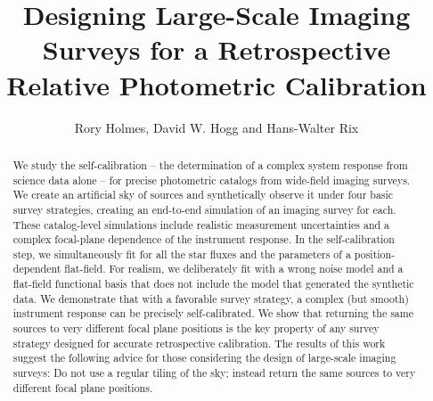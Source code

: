 \documentclass[preprint,pdftex]{aastex}
\begin{document}

\title{Designing Large-Scale Imaging Surveys for a Retrospective Relative Photometric Calibration}


\author{Rory Holmes, David W. Hogg and Hans-Walter Rix}

\begin{abstract}
We study the self-calibration -- the determination of a complex system
response from science data alone -- for precise photometric catalogs
from wide-field imaging surveys. We create an artificial sky of sources
and synthetically observe it under four basic survey strategies,
creating an end-to-end simulation of an imaging survey for each. These
catalog-level simulations include realistic measurement uncertainties
and a complex focal-plane dependence of the instrument response. In the
self-calibration step, we simultaneously fit for all the star fluxes
and the parameters of a position-dependent flat-field.  For realism,
we deliberately fit with a wrong noise model and a flat-field
functional basis that does not include the model that generated the
synthetic data.  We demonstrate that with a favorable survey strategy,
a complex (but smooth) instrument response can be precisely
self-calibrated. We show that returning the same sources to very
different focal plane positions is the key property of any survey
strategy designed for accurate retrospective calibration. The results
of this work suggest the following advice for those considering the
design of large-scale imaging surveys: Do not use a regular tiling of
the sky; instead return the same sources to very different focal plane
positions.
\end{abstract}

\end{document}
